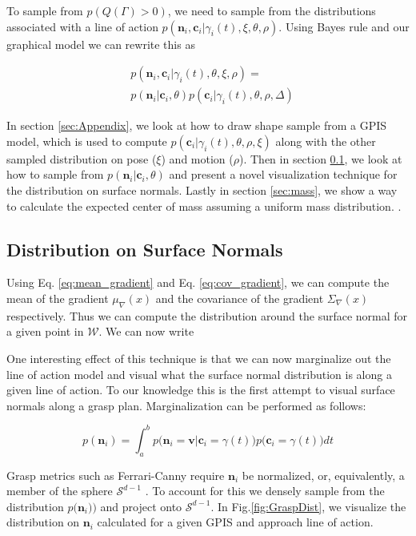 \documentclass[letterpaper, 10 pt, conference]{ieeeconf}  %
\begin{document}
 To sample from $p(Q(\Gamma)>0)$, we need to sample from the distributions associated with a line of action $p(\textbf{n}_i,\textbf{c}_i|\gamma_i(t),\xi,\theta, \rho)$. Using Bayes rule and our graphical model we can rewrite this as 
 
 \vspace{-2ex}
 \begin{align*}
 &p(\textbf{n}_i,\textbf{c}_i |\gamma_i(t),\theta,\xi,\rho)=\\
 &p(\textbf{n}_i|\textbf{c}_i,\theta)p(\textbf{c}_i|\gamma_i(t),\theta,\rho,\Delta)
 \end{align*}
 
 In section \ref{sec:Appendix}, we look at how to draw shape sample from a GPIS model, which is used to compute $p(\textbf{c}_i|\gamma_i(t),\theta,\rho,\xi)$ along with the other sampled distribution on pose ($\xi$) and motion ($\rho$). Then in section \ref{sec:normals}, we look at how to sample from $p(\textbf{n}_i|\textbf{c}_i,\theta)$ and present a novel visualization technique for the distribution on surface normals. Lastly in section \ref{sec:mass}, we show a way to calculate the expected center of mass assuming a uniform mass distribution. 
 .
\subsection{Distribution on Surface Normals}\label{sec:normals} 
Using Eq. \ref{eq:mean_gradient} and Eq. \ref{eq:cov_gradient}, we can compute the mean of the gradient $ \mu_{\nabla}(x)$ and the covariance of the gradient $\Sigma_{\nabla}(x)$ respectively. Thus we can compute the distribution around the surface normal for a given point in $\mathcal{W}$. We can now write 

One interesting effect of this technique is that we can now marginalize out the line of action model and visual what the surface normal distribution is along a given line of action. To our knowledge this is the first attempt to visual surface normals along a grasp plan. Marginalization can be performed as follows:

\vspace{-2ex}
\begin{equation}
    p(\textbf{n}_i ) = \int_a^b   p\big(\textbf{n}_i = \textbf{v} | \textbf{c}_i = \gamma(t) \big)p\big(\textbf{c}_i = \gamma(t)\big) dt \label{eq:normal_dist}
\end{equation}

Grasp metrics such as  Ferrari-Canny require $\textbf{n}_i$ be normalized, or, equivalently, a member of the sphere $\mathcal{S}^{d-1}$ \cite{ferrari1992}. To account for this we densely sample from the  distribution $p \big(\textbf{n}_i ) \big)$  and project onto $\mathcal{S}^{d-1}$.  In Fig.\ref{fig:GraspDist}, we visualize the distribution on $\textbf{n}_i$ calculated for a given GPIS and approach line of action.
\end{document}
